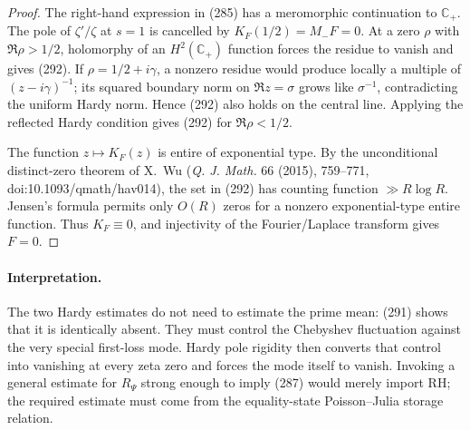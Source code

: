 \documentclass[11pt]{article}
\begin{document}
\begin{proof}
The right-hand expression in (285) has a meromorphic continuation to
$\mathbb C_+$.  The pole of $\zeta'/\zeta$ at $s=1$ is cancelled by
$K_F(1/2)=M_-F=0$.  At a zero $\rho$ with $\Re\rho>1/2$, holomorphy of an
$H^2(\mathbb C_+)$ function forces the residue to vanish and gives (292).
If $\rho=1/2+i\gamma$, a nonzero residue would produce locally a multiple
of $(z-i\gamma)^{-1}$; its squared boundary norm on $\Re z=\sigma$ grows
like $\sigma^{-1}$, contradicting the uniform Hardy norm.  Hence (292)
also holds on the central line.  Applying the reflected Hardy condition
gives (292) for $\Re\rho<1/2$.

The function $z\mapsto K_F(z)$ is entire of exponential type.  By the
unconditional distinct-zero theorem of X.~Wu
(\emph{Q. J. Math.} 66 (2015), 759--771,
doi:10.1093/qmath/hav014), the set in (292) has counting function
$\gg R\log R$.
Jensen's formula permits only $O(R)$ zeros for a nonzero exponential-type
entire function.  Thus $K_F\equiv0$, and injectivity of the Fourier/Laplace
transform gives $F=0$.
\end{proof}

\paragraph{Interpretation.}
The two Hardy estimates do not need to estimate the prime mean: (291)
shows that it is identically absent.  They must control the Chebyshev
fluctuation against the very special first-loss mode.  Hardy pole rigidity
then converts that control into vanishing at every zeta zero and forces the
mode itself to vanish.  Invoking a general estimate for $R_\Psi$ strong
enough to imply (287) would merely import RH; the required estimate must
come from the equality-state Poisson--Julia storage relation.
\end{document}
